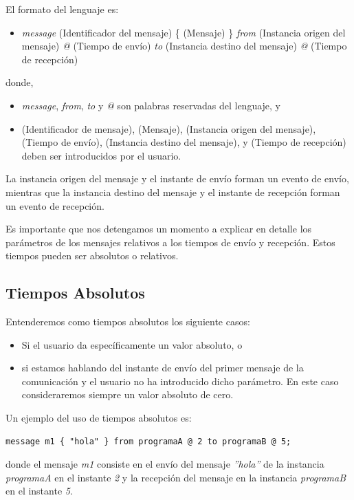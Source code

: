 \documentclass[12pt,a4paper]{report}
\begin{document}
El formato del lenguaje es:

\begin{itemize}
\item \textit{message} (Identificador del mensaje) \{ (Mensaje) \} \textit{from} (Instancia origen del mensaje) \textit{@} (Tiempo de envío) \textit{to} (Instancia destino del mensaje) \textit{@} (Tiempo de recepción)
\end{itemize}

donde,
\begin{itemize}
\item \textit{message}, \textit{from}, \textit{to} y \textit{@} son palabras reservadas del lenguaje, y
\item (Identificador de mensaje), (Mensaje), (Instancia origen del mensaje), (Tiempo de envío), (Instancia destino del mensaje), y (Tiempo de recepción) deben ser introducidos por el usuario.
\end{itemize}

La instancia origen del mensaje y el instante de envío forman un evento de envío, mientras que la instancia destino del mensaje y el instante de recepción forman un evento de recepción.

Es importante que nos detengamos un momento a explicar en detalle los parámetros de los mensajes relativos a los tiempos de envío y recepción. Estos tiempos pueden ser absolutos o relativos.

\subsection{Tiempos Absolutos}

Entenderemos como tiempos absolutos los siguiente casos:

\begin{itemize}
\item Si el usuario da específicamente un valor absoluto, o
\item si estamos hablando del instante de envío del primer mensaje de la comunicación y el usuario no ha introducido dicho parámetro. En este caso consideraremos siempre un valor absoluto de cero. 
\end{itemize}

Un ejemplo del uso de tiempos absolutos es:

\begin{verbatim}
message m1 { "hola" } from programaA @ 2 to programaB @ 5;
\end{verbatim}

donde el mensaje \textit{m1} consiste en el envío del mensaje \textit{''hola''} de la instancia \textit{programaA} en el instante \textit{2} y la recepción del mensaje en la instancia \textit{programaB} en el instante \textit{5}.
\end{document}
